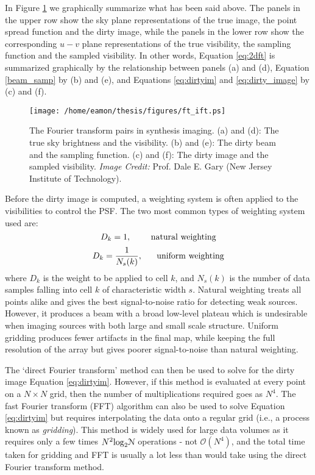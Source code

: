 In Figure \ref{fig2.10} we graphically summarize what has been said above. The panels in the upper row show the sky plane representations of the true image, the point spread function and the dirty image, while the panels in the lower row show the corresponding $u-v$ plane representations of the true visibility, the sampling function and the sampled visibility. In other words, Equation \ref{eq:2dft} is summarized graphically by the relationship between panels (a) and (d),  Equation \ref{beam_samp} by (b) and (e), and Equations \ref{eq:dirtyim} and \ref{eq:dirty_image} by (c) and (f).

\begin{figure}[hbt!]
\centering 
          \texttt{[image: /home/eamon/thesis/figures/ft\_ift.ps]}
\caption[The Fourier transform pairs in synthesis imaging.]{The Fourier transform pairs in synthesis imaging. (a) and (d): The true sky brightness and the visibility. (b) and (e): The dirty beam and the sampling function. (c) and (f): The dirty image and the sampled visibility. \textit{Image Credit:} Prof. Dale E. Gary (New Jersey Institute of Technology).}
\label{fig2.10}
\end{figure}

Before the dirty image is computed, a weighting system is often applied to the visibilities to control the PSF. The two most common types of weighting system used are:
\begin{equation}
D_{k}=1,	\ \ \ \ \ \ \ \rm{natural \ weighting}
\end{equation}
\begin{equation}
D_{k}=\frac{1}{N_{s}(k)}, \ \ \ \ \ \rm{uniform \ weighting}
\end{equation}
where $D_{k}$ is the weight to be applied to cell $k$, and ${N_{s}(k)}$ is the number of data samples falling into cell $k$ of characteristic width $s$. Natural weighting treats all points alike and gives the best signal-to-noise ratio for detecting weak sources. However, it produces a beam with a broad low-level plateau which is undesirable when imaging sources with both large and small scale structure. Uniform gridding produces fewer artifacts in the final map, while keeping the full resolution of the array but gives poorer signal-to-noise than natural weighting.

The `direct Fourier transform' method can then be used to solve for the dirty image Equation \ref{eq:dirtyim}. However, if this method is evaluated at every point on a $N\times N$ grid, then the number of multiplications required goes as $N^{4}$. The fast Fourier transform (FFT) algorithm can also be used to solve Equation \ref{eq:dirtyim} but requires interpolating the data onto a regular grid (i.e., a process known as \textit{gridding}). This method is widely used for large data volumes as it requires only a few times $N^{2}\rm{log}_{2}\mathcal{N}$ operations - not $\mathcal{O}(N^4)$, and the total time taken for gridding and FFT is usually a lot less than would take using the direct Fourier transform method.

